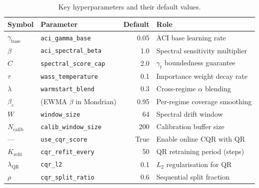 \begin{table}[h]
\centering
\caption{Key hyperparameters and their default values.}
\label{tab:hyperparams}
\begin{tabular}{llrl}
\toprule
\textbf{Symbol} & \textbf{Parameter} & \textbf{Default} & \textbf{Role} \\
\midrule
$\gamma_{\mathrm{base}}$ & \texttt{aci\_gamma\_base} & 0.05
  & ACI base learning rate \\
$\beta$ & \texttt{aci\_spectral\_beta} & 1.0
  & Spectral sensitivity multiplier \\
$C$ & \texttt{spectral\_score\_cap} & 2.0
  & $\gamma_t$ boundedness guarantee \\
$\tau$ & \texttt{wass\_temperature} & 0.1
  & Importance weight decay rate \\
$\lambda$ & \texttt{warmstart\_blend} & 0.3
  & Cross-regime $\alpha$ blending \\
$\beta_c$ & (EWMA $\beta$ in Mondrian) & 0.95
  & Per-regime coverage smoothing \\
$W$ & \texttt{window\_size} & 64
  & Spectral drift window \\
$N_{\mathrm{calib}}$ & \texttt{calib\_window\_size} & 200
  & Calibration buffer size \\
--- & \texttt{use\_cqr\_score} & True
  & Enable online CQR with QR \\
$K_{\mathrm{refit}}$ & \texttt{cqr\_refit\_every} & 50
  & QR retraining period (steps) \\
$\lambda_{\mathrm{QR}}$ & \texttt{cqr\_l2} & 0.1
  & $L_2$ regularisation for QR \\
$\rho$ & \texttt{cqr\_split\_ratio} & 0.6
  & Sequential split fraction \\
\bottomrule
\end{tabular}
\end{table}

